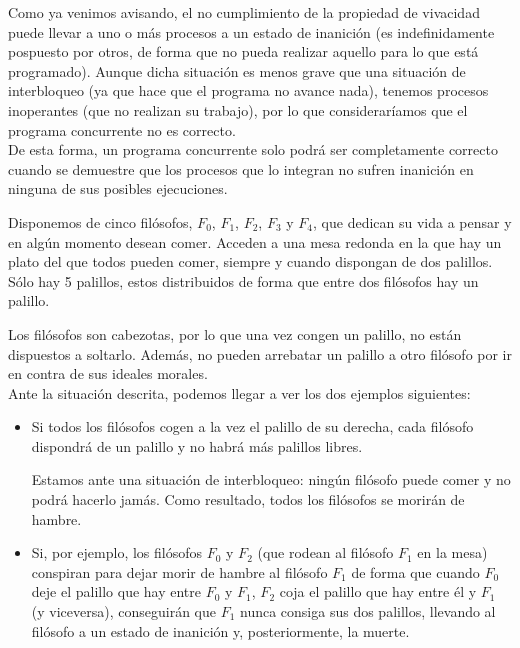 Como ya venimos avisando, el no cumplimiento de la propiedad de vivacidad puede llevar a uno o más procesos a un estado de inanición (es indefinidamente pospuesto por otros, de forma que no pueda realizar aquello para lo que está programado). Aunque dicha situación es menos grave que una situación de interbloqueo (ya que hace que el programa no avance nada), tenemos procesos inoperantes (que no realizan su trabajo), por lo que consideraríamos que el programa concurrente no es correcto.\\

De esta forma, un programa concurrente solo podrá ser completamente correcto cuando se demuestre que los procesos que lo integran no sufren inanición en ninguna de sus posibles ejecuciones.

\begin{ejemplo}
    Disponemos de cinco filósofos, $F_0$, $F_1$, $F_2$, $F_3$ y $F_4$, que dedican su vida a pensar y en algún momento desean comer. Acceden a una mesa redonda en la que hay un plato del que todos pueden comer, siempre y cuando dispongan de dos palillos. Sólo hay 5 palillos, estos distribuidos de forma que entre dos filósofos hay un palillo.

    Los filósofos son cabezotas, por lo que una vez congen un palillo, no están dispuestos a soltarlo. Además, no pueden arrebatar un palillo a otro filósofo por ir en contra de sus ideales morales.\\

    Ante la situación descrita, podemos llegar a ver los dos ejemplos siguientes:
    \begin{itemize}
        \item Si todos los filósofos cogen a la vez el palillo de su derecha, cada filósofo dispondrá de un palillo y no habrá más palillos libres. 

            Estamos ante una situación de interbloqueo: ningún filósofo puede comer y no podrá hacerlo jamás. Como resultado, todos los filósofos se morirán de hambre.
        \item Si, por ejemplo, los filósofos $F_0$ y $F_2$ (que rodean al filósofo $F_1$ en la mesa) conspiran para dejar morir de hambre al filósofo $F_1$ de forma que cuando $F_0$ deje el palillo que hay entre $F_0$ y $F_1$, $F_2$ coja el palillo que hay entre él y $F_1$ (y viceversa), conseguirán que $F_1$ nunca consiga sus dos palillos, llevando al filósofo a un estado de inanición y, posteriormente, la muerte.
    \end{itemize}
\end{ejemplo}

